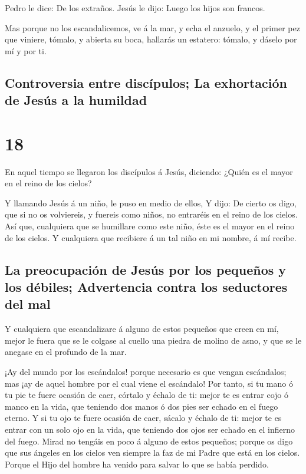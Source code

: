  Pedro le dice: De los extraños. Jesús le dijo: Luego los
hijos son francos.

 Mas porque no los escandalicemos, ve á la mar, y echa el
anzuelo, y el primer pez que viniere, tómalo, y abierta su boca,
hallarás un estatero: tómalo, y dáselo por mí y por ti.

\hypertarget{controversia-entre-discuxedpulos-la-exhortaciuxf3n-de-jesuxfas-a-la-humildad}{%
\subsection{Controversia entre discípulos; La exhortación de Jesús a la
humildad}\label{controversia-entre-discuxedpulos-la-exhortaciuxf3n-de-jesuxfas-a-la-humildad}}

\hypertarget{section-17}{%
\section{18}\label{section-17}}

 En aquel tiempo se llegaron los discípulos á Jesús,
diciendo: ¿Quién es el mayor en el reino de los cielos?

 Y llamando Jesús á un niño, le puso en medio de ellos,
 Y dijo: De cierto os digo, que si no os volviereis, y
fuereis como niños, no entraréis en el reino de los cielos.
 Así que, cualquiera que se humillare como este niño, éste
es el mayor en el reino de los cielos.  Y cualquiera que
recibiere á un tal niño en mi nombre, á mí recibe.

\hypertarget{la-preocupaciuxf3n-de-jesuxfas-por-los-pequeuxf1os-y-los-duxe9biles-advertencia-contra-los-seductores-del-mal}{%
\subsection{La preocupación de Jesús por los pequeños y los débiles;
Advertencia contra los seductores del
mal}\label{la-preocupaciuxf3n-de-jesuxfas-por-los-pequeuxf1os-y-los-duxe9biles-advertencia-contra-los-seductores-del-mal}}

 Y cualquiera que escandalizare á alguno de estos pequeños
que creen en mí, mejor le fuera que se le colgase al cuello una piedra
de molino de asno, y que se le anegase en el profundo de la mar.

 ¡Ay del mundo por los escándalos! porque necesario es que
vengan escándalos; mas ¡ay de aquel hombre por el cual viene el
escándalo!  Por tanto, si tu mano ó tu pie te fuere
ocasión de caer, córtalo y échalo de ti: mejor te es entrar cojo ó manco
en la vida, que teniendo dos manos ó dos pies ser echado en el fuego
eterno.  Y si tu ojo te fuere ocasión de caer, sácalo y
échalo de ti: mejor te es entrar con un solo ojo en la vida, que
teniendo dos ojos ser echado en el infierno del fuego. 
Mirad no tengáis en poco á alguno de estos pequeños; porque os digo que
sus ángeles en los cielos ven siempre la faz de mi Padre que está en los
cielos.  Porque el Hijo del hombre ha venido para salvar
lo que se había perdido.

